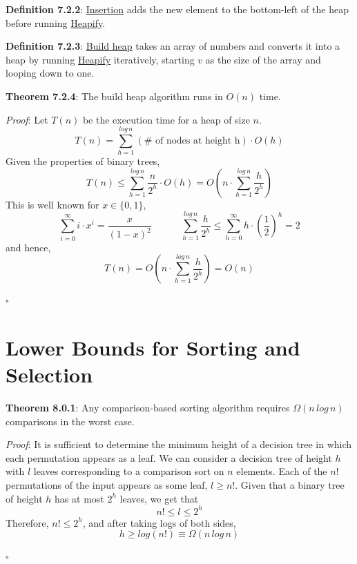 \documentclass{article}
\newcommand{\separate}[1] {\vspace{#1 pt}\noindent}
\newcommand{\definition}[2]{\textbf{Definition #1}: #2\label{def:#1}}
\newcommand{\proof}[2]{\textit{Proof}: #2 \begin{flushright}\(\square\)\end{flushright}\label{prf:#1}}
\newcommand{\theorem}[3]{\textbf{Theorem #1}: #2 \par\separate{3}\proof{thm:#1}{#3}\label{thm:#1}}
\begin{document}
\noindent\definition{7.2.2}{\underline{Insertion} adds the new element to the bottom-left of the heap before running \hyperref[alg:Heapify]{Heapify}.}

\separate{5}\definition{7.2.3}{\underline{Build heap} takes an array of numbers and converts it into a heap by running \hyperref[alg:Heapify]{Heapify} iteratively, starting \(v\) as the size of the array and looping down to one.}

\separate{5}\theorem{7.2.4}{The build heap algorithm runs in \(O(n)\) time.}
{Let \(T(n)\) be the execution time for a heap of size \(n\).
    \begin{equation}
        T(n) = \sum^{log\,n}_{h=1} (\# \text{ of nodes at height h}) \cdot O(h)
    \end{equation}
    Given the properties of binary trees, 
    \begin{equation}
        T(n) \leq \sum^{log\,n}_{h=1} \frac{n}{2^h} \cdot O(h) = O\left( n \cdot \sum^{log\,n}_{h=1} \frac{h}{2^h} \right)
    \end{equation}
    This is well known for \(x \in \{0,1\}\),
    \begin{equation}
        \sum^\infty_{i=0} i \cdot x^i = \frac{x}{(1-x)^2} \quad\quad\quad \sum^{log \, n}_{h=1} \frac{h}{2^h} \leq \sum^\infty_{h=0}h \cdot \left(\frac{1}{2}\right)^h = 2
    \end{equation}
    and hence,
    \begin{equation}
        T(n) = O \left(n \cdot \sum^{log \, n}_{h=1} \frac{h}{2^h}\right) = O(n)
    \end{equation}
}

\newpage\section{Lower Bounds for Sorting and Selection}

\theorem{8.0.1}{Any comparison-based sorting algorithm requires \(\Omega(n\,log\,n)\) comparisons in the worst case.}
{It is sufficient to determine the minimum height of a decision tree in which each permutation appears as a leaf. 
We can consider a decision tree of height \(h\) with \(l\) leaves corresponding to a comparison sort on \(n\) elements. Each of the \(n!\) permutations of the input appears as some leaf, \(l \geq n!\). Given that a binary tree of height \(h\) has at most \(2^h\) leaves, we get that
\begin{equation}
    n! \leq l \leq 2^h
\end{equation}
Therefore, \(n! \leq 2^h\), and after taking logs of both sides,
\begin{equation}
    h \geq log(n!) \equiv \Omega(n\,log\,n)
\end{equation}}
\end{document}
